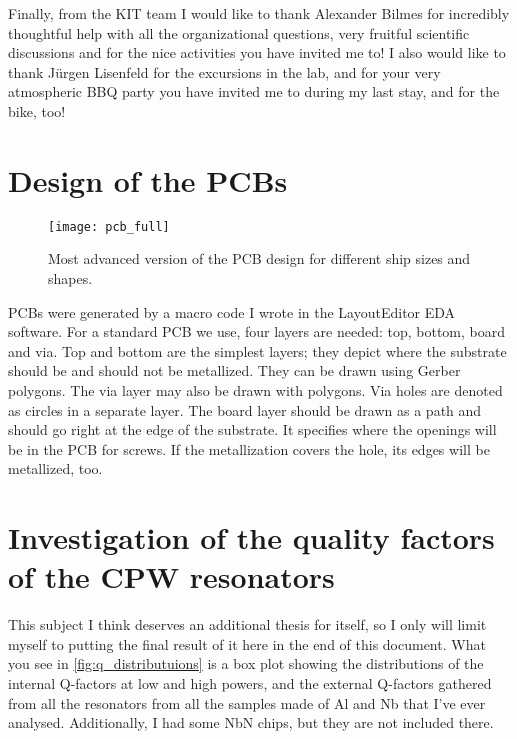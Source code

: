 \documentclass[12pt, twoside]{report}
\renewcommand*\thesection{\arabic{section}}
\numberwithin{equation}{section}
\renewcommand*\thesection{\arabic{chapter}.\arabic{section}}
\begin{document}
Finally, from the KIT team I would like to thank Alexander Bilmes for incredibly thoughtful help with all the organizational questions, very fruitful scientific discussions and for the nice activities you have invited me to! I also would like to thank Jürgen Lisenfeld for the excursions in the lab, and for your very atmospheric BBQ party you have invited me to during my last stay, and for the bike, too!




\appendix
\renewcommand*\thesection{\Alph{chapter}.\arabic{section}}






\chapter{Design of the PCBs}

\begin{figure}[h!]
\texttt{[image: pcb\_full]}
\caption{Most advanced version of the PCB design for different ship sizes and shapes.}
\end{figure}

PCBs were generated by a macro code I wrote in the LayoutEditor EDA software. For a standard PCB we use, four layers are needed: top, bottom, board and via. Top and bottom are the simplest layers; they depict where the substrate should be and should not be metallized. They can be drawn using Gerber polygons. The via layer may also be drawn with polygons. Via holes are denoted as circles in a separate layer. The board layer should be drawn as a path and should go right at the edge of the substrate. It specifies where the openings will be in the PCB for screws. If the metallization covers the hole, its edges will be metallized, too.


\chapter{Investigation of the quality factors of the CPW resonators}

This subject I think deserves an additional thesis for itself, so I only will limit myself to putting the final result of it here in the end of this document. What you see in \autoref{fig:q_distributuions} is a box plot showing the distributions of the internal Q-factors at low and high powers, and the external Q-factors gathered from all the resonators from all the samples made of Al and Nb that I've ever analysed. Additionally, I had some NbN chips, but they are not included there. 
\end{document}
